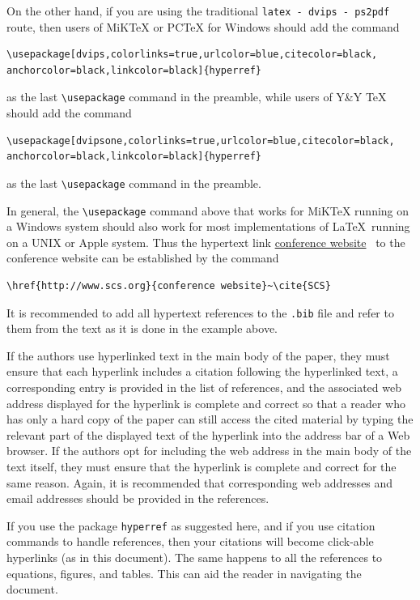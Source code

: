\documentclass{article}
\begin{document}
On the other hand, if you are using the traditional \texttt{latex - dvips - ps2pdf} route, then users of MiKTeX or PCTeX for Windows should add the command

\begin{verbatim}
\usepackage[dvips,colorlinks=true,urlcolor=blue,citecolor=black,
anchorcolor=black,linkcolor=black]{hyperref}
\end{verbatim}

as the last \verb+\usepackage+ command in the preamble, while users of Y\&Y TeX should add the command

\begin{verbatim}
\usepackage[dvipsone,colorlinks=true,urlcolor=blue,citecolor=black,
anchorcolor=black,linkcolor=black]{hyperref}
\end{verbatim}

as the last \verb+\usepackage+ command in the preamble.

In general, the \verb+\usepackage+ command above that works for MiKTeX running on a Windows system should also work for most implementations of \LaTeX\ running on a UNIX or Apple system.
Thus the hypertext link \href{http://www.scs.org}{conference website}~\cite{SCS} to the conference website can be established by the command

\begin{verbatim}
\href{http://www.scs.org}{conference website}~\cite{SCS}
\end{verbatim}

It is recommended to add all hypertext references to the \texttt{.bib} file and refer to them from the text as it is done in the example above.

If the authors use hyperlinked text in the main body of the paper, they must ensure that each hyperlink includes a citation following the hyperlinked text, a corresponding entry is provided in the list of references, and the associated web address displayed for the hyperlink is complete and correct so that a reader who has only a hard copy of the paper can still access the cited material by typing the relevant part of the displayed text of the hyperlink into the address bar of a Web browser. If the authors opt for including the web address in the main body of the text itself, they must ensure that the hyperlink is complete and correct for the same reason. Again, it is recommended that corresponding web addresses and email addresses should be provided in the references.

If you use the package \texttt{hyperref} as suggested here, and if you use citation commands to handle references, then your citations will
become click-able hyperlinks (as in this document). The same happens to all the references to equations, figures, and tables. This can aid the reader in navigating the document.
\end{document}
